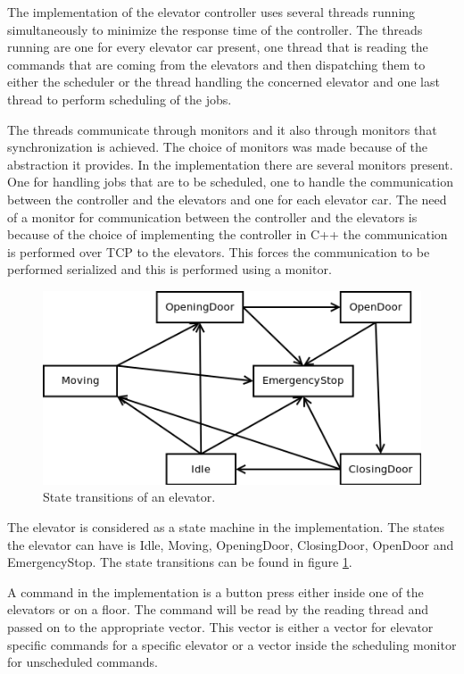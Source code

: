\documentclass[10pt,a4paper]{article}
\begin{document}
The implementation of the elevator controller uses several threads running simultaneously to minimize the response time of the controller. The threads running are one for every elevator car present, one thread that is reading the commands that are coming from the elevators and then dispatching them to either the scheduler or the thread handling the concerned elevator and one last thread to perform scheduling of the jobs.

The threads communicate through monitors and it also through monitors that synchronization is achieved. The choice of monitors was made because of the abstraction it provides. In the implementation there are several monitors present. One for handling jobs that are to be scheduled, one to handle the communication between the controller and the elevators and one for each elevator car. The need of a monitor for communication between the controller and the elevators is because of the choice of implementing the controller in C++ the communication is performed over TCP to the elevators. This forces the communication to be performed serialized and this is performed using a monitor.

\begin{figure}[!h]
\centering
\includegraphics[scale=0.5]{state_transition.png}
\caption{State transitions of an elevator.}
\label{fig:states}
\end{figure}

The elevator is considered as a state machine in the implementation. The states the elevator can have is Idle, Moving, OpeningDoor, ClosingDoor, OpenDoor and EmergencyStop. The state transitions can be found in figure \ref{fig:states}.

A command in the implementation is a button press either inside one of the elevators or on a floor. The command will be read by the reading thread and passed on to the appropriate vector. This vector is either a vector for elevator specific commands for a specific elevator or a vector inside the scheduling monitor for unscheduled commands.
\end{document}
